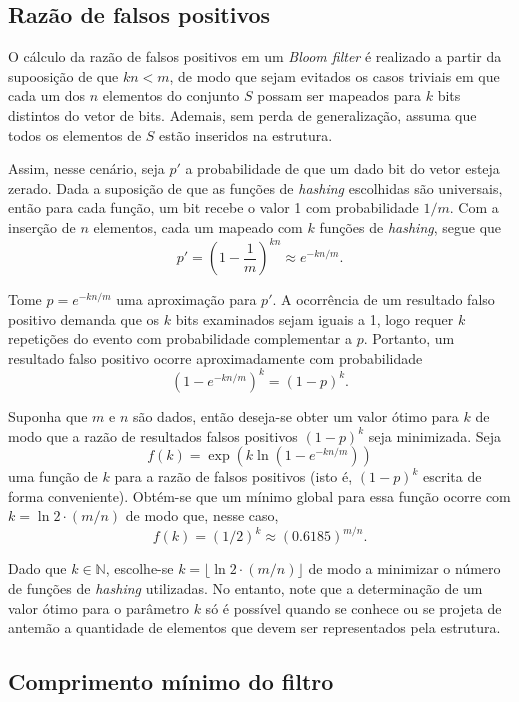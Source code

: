 \documentclass[12pt,twoside,english,brazilian]{article}
\begin{document}
\subsection{Razão de falsos positivos}

O cálculo da razão de falsos positivos em um \textit{Bloom filter} é realizado a partir da supoosição de que $kn < m$, de modo que sejam evitados os casos triviais em que cada um dos $n$ elementos do conjunto $S$ possam ser mapeados para $k$ bits distintos do vetor de bits. Ademais, sem perda de generalização, assuma que todos os elementos de $S$ estão inseridos na estrutura.

Assim, nesse cenário, seja $p'$ a probabilidade de que um dado bit do vetor esteja zerado. Dada a suposição de que as funções de \textit{hashing} escolhidas são universais, então para cada função, um bit recebe o valor 1 com probabilidade $1/m$. Com a inserção de $n$ elementos, cada um mapeado com $k$ funções de \textit{hashing}, segue que $$p' = \left( 1 - \frac{1}{m}\right)^{kn} \approx e^{-kn/m}.$$

Tome $p = e^{-kn/m}$ uma aproximação para $p'$. A ocorrência de um resultado falso positivo demanda que os $k$ bits examinados sejam iguais a 1, logo requer $k$ repetições do evento com probabilidade complementar a $p$. Portanto, um resultado falso positivo ocorre aproximadamente com probabilidade $$\left( 1 - e^{-kn/m} \right)^{k} = (1-p)^k.$$

Suponha que $m$ e $n$ são dados, então deseja-se obter um valor ótimo para $k$ de modo que a razão de resultados falsos positivos $(1-p)^k$ seja minimizada. Seja $$f(k) = \exp\left(k\ln(1-e^{-kn/m})\right)$$ uma função de $k$ para a razão de falsos positivos (isto é, $(1-p)^k$ escrita de forma conveniente). Obtém-se que um mínimo global para essa função ocorre com $k = \ln 2 \cdot (m/n)$ de modo que, nesse caso, $$f(k) = (1/2)^k \approx (0.6185)^{m/n}.$$

Dado que $k \in \mathbb{N}$, escolhe-se $k = \lfloor \ln 2 \cdot (m/n) \rfloor$ de modo a minimizar o número de funções de \textit{hashing} utilizadas. No entanto, note que a determinação de um valor ótimo para o parâmetro $k$ só é possível quando se conhece ou se projeta de antemão a quantidade de elementos que devem ser representados pela estrutura.

\subsection{Comprimento mínimo do filtro}
\end{document}
